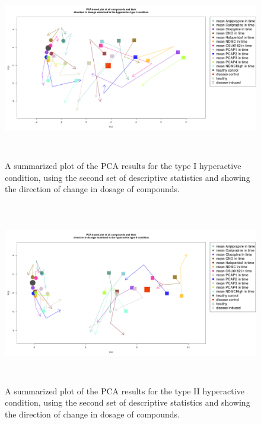 \documentclass[a4paper,12pt]{article}
\begin{document}
\begin{figure}[h!]
\begin{center}
\includegraphics[width=16cm,height=8cm]{All_together_doses_DarkApoHighset2.png}
\caption{A summarized plot of the PCA results for the type I hyperactive condition, using the second set of descriptive statistics and showing the direction of change in dosage of compounds.}
\end{center}
\end{figure}
\newpage

\begin{figure}[h!]
\begin{center}
\includegraphics[width=16cm,height=8cm]{All_together_doses_DarkPTZset2.png}
\caption{A summarized plot of the PCA results for the type II hyperactive condition, using the second set of descriptive statistics and showing the direction of change in dosage of compounds.}
\end{center}
\end{figure}
\newpage
\end{document}
